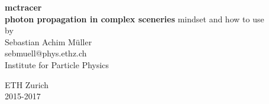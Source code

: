 \documentclass[11pt,a4paper,oneside,titlepage]{book}
\begin{document}
\newcommand{\CppFileStartEnd}[3]{%
\newline
\begin{footnotesize}%
\begin{minipage}{\linewidth}%
\vspace{3mm}%
\textcolor{LightGray}{\path{#1}}%
\vspace{-1mm}%
%
\end{minipage}%
\end{footnotesize}%
}%

\newcommand{\TxtFile}[1]{%
    \begin{footnotesize}
    \end{footnotesize}
}

\newcommand{\ill}[1]{%
    \begin{lstlisting}#1\end{lstlisting}    
}

\newcommand{\CenFig}[2]{
    \begin{figure}[H]
        \begin{center}
            \texttt{[image: \#1]}
        \end{center}
    \end{figure}
}

\makeatletter
{}
\def\lst@SkipToFirst{%
    \lst@ifmatchrangestart\c@lstnumber=\numexpr-1+\lst@firstline\fi
    \ifnum \lst@lineno<\lst@firstline
        \def\lst@next{\lst@BeginDropInput\lst@Pmode
        \lst@Let{13}\lst@MSkipToFirst
        \lst@Let{10}\lst@MSkipToFirst}%
        \expandafter\lst@next
    \else
        \expandafter\lst@BOLGobble
    \fi}
\makeatother
\newcommand{\tool}{mctracer}
\newcommand{\thetitle}{\tool\\ \large{photon propagation in complex sceneries}}
%
\thispagestyle{empty}
\begin{center}
\Huge\textbf{\thetitle}
%
\vfill
%
\Large
mindset and how to use\\
\vspace{20pt}
\normalsize
{by\\\Large Sebastian Achim M\"uller } \\[5pt]
%
{\normalsize sebmuell@phys.ethz.ch}\\
%
\vspace{20pt}
Institute for Particle Physics
\par\smallskip\noindent
ETH Zurich\\2015-2017
\end{center}
\tableofcontents
\cleardoublepage
%
\setcounter{page}{0}
%
\end{document}
